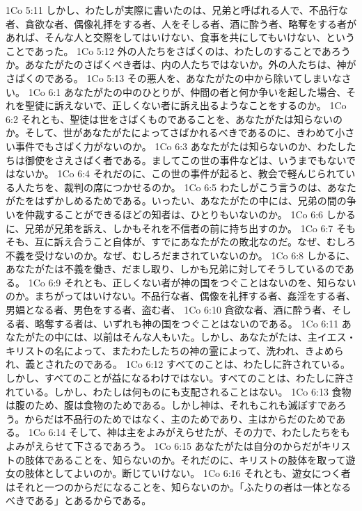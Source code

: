 1Co 5:11  しかし、わたしが実際に書いたのは、兄弟と呼ばれる人で、不品行な者、貪欲な者、偶像礼拝をする者、人をそしる者、酒に酔う者、略奪をする者があれば、そんな人と交際をしてはいけない、食事を共にしてもいけない、ということであった。
1Co 5:12  外の人たちをさばくのは、わたしのすることであろうか。あなたがたのさばくべき者は、内の人たちではないか。外の人たちは、神がさばくのである。
1Co 5:13  その悪人を、あなたがたの中から除いてしまいなさい。
1Co 6:1  あなたがたの中のひとりが、仲間の者と何か争いを起した場合、それを聖徒に訴えないで、正しくない者に訴え出るようなことをするのか。
1Co 6:2  それとも、聖徒は世をさばくものであることを、あなたがたは知らないのか。そして、世があなたがたによってさばかれるべきであるのに、きわめて小さい事件でもさばく力がないのか。
1Co 6:3  あなたがたは知らないのか、わたしたちは御使をさえさばく者である。ましてこの世の事件などは、いうまでもないではないか。
1Co 6:4  それだのに、この世の事件が起ると、教会で軽んじられている人たちを、裁判の席につかせるのか。
1Co 6:5  わたしがこう言うのは、あなたがたをはずかしめるためである。いったい、あなたがたの中には、兄弟の間の争いを仲裁することができるほどの知者は、ひとりもいないのか。
1Co 6:6  しかるに、兄弟が兄弟を訴え、しかもそれを不信者の前に持ち出すのか。
1Co 6:7  そもそも、互に訴え合うこと自体が、すでにあなたがたの敗北なのだ。なぜ、むしろ不義を受けないのか。なぜ、むしろだまされていないのか。
1Co 6:8  しかるに、あなたがたは不義を働き、だまし取り、しかも兄弟に対してそうしているのである。
1Co 6:9  それとも、正しくない者が神の国をつぐことはないのを、知らないのか。まちがってはいけない。不品行な者、偶像を礼拝する者、姦淫をする者、男娼となる者、男色をする者、盗む者、
1Co 6:10  貪欲な者、酒に酔う者、そしる者、略奪する者は、いずれも神の国をつぐことはないのである。
1Co 6:11  あなたがたの中には、以前はそんな人もいた。しかし、あなたがたは、主イエス・キリストの名によって、またわたしたちの神の霊によって、洗われ、きよめられ、義とされたのである。
1Co 6:12  すべてのことは、わたしに許されている。しかし、すべてのことが益になるわけではない。すべてのことは、わたしに許されている。しかし、わたしは何ものにも支配されることはない。
1Co 6:13  食物は腹のため、腹は食物のためである。しかし神は、それもこれも滅ぼすであろう。からだは不品行のためではなく、主のためであり、主はからだのためである。
1Co 6:14  そして、神は主をよみがえらせたが、その力で、わたしたちをもよみがえらせて下さるであろう。
1Co 6:15  あなたがたは自分のからだがキリストの肢体であることを、知らないのか。それだのに、キリストの肢体を取って遊女の肢体としてよいのか。断じていけない。
1Co 6:16  それとも、遊女につく者はそれと一つのからだになることを、知らないのか。「ふたりの者は一体となるべきである」とあるからである。
